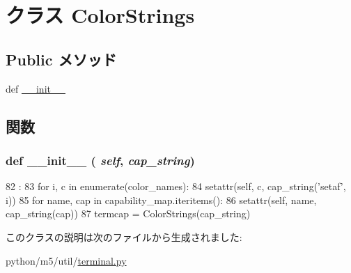 \hypertarget{classm5_1_1util_1_1terminal_1_1ColorStrings}{
\section{クラス ColorStrings}
\label{classm5_1_1util_1_1terminal_1_1ColorStrings}
}
\subsection*{Public メソッド}
\begin{DoxyCompactItemize}
\item 
def \hyperlink{classm5_1_1util_1_1terminal_1_1ColorStrings_ac775ee34451fdfa742b318538164070e}{\_\-\_\-init\_\-\_\-}
\end{DoxyCompactItemize}


\subsection{関数}
\hypertarget{classm5_1_1util_1_1terminal_1_1ColorStrings_ac775ee34451fdfa742b318538164070e}{
\subsubsection[{\_\-\_\-init\_\-\_\-}]{\setlength{\rightskip}{0pt plus 5cm}def \_\-\_\-init\_\-\_\- ( {\em self}, \/   {\em cap\_\-string})}}
\label{classm5_1_1util_1_1terminal_1_1ColorStrings_ac775ee34451fdfa742b318538164070e}



\begin{DoxyCode}
82                                   :
83         for i, c in enumerate(color_names):
84             setattr(self, c, cap_string('setaf', i))
85         for name, cap in capability_map.iteritems():
86             setattr(self, name, cap_string(cap))
87 
termcap = ColorStrings(cap_string)
\end{DoxyCode}


このクラスの説明は次のファイルから生成されました:\begin{DoxyCompactItemize}
\item 
python/m5/util/\hyperlink{terminal_8py}{terminal.py}\end{DoxyCompactItemize}

